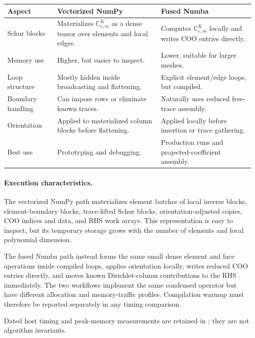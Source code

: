 \documentclass[11pt]{article}
\newcommand{\C}{\mathbb C}
\begin{document}
\begin{center}
\renewcommand{\arraystretch}{1.25}
\begin{tabular}{>{\raggedright\arraybackslash}p{} >{\raggedright\arraybackslash}p{} >{\raggedright\arraybackslash}p{}}
\toprule
Aspect & Vectorized NumPy & Fused Numba \\
\midrule
Schur blocks & Materializes $\C_{e,m}^K$ as a dense tensor over elements and local edges. & Computes $\C_{e,m}^K$ locally and writes COO entries directly. \\
Memory use & Higher, but easier to inspect. & Lower, suitable for larger meshes. \\
Loop structure & Mostly hidden inside broadcasting and flattening. & Explicit element/edge loops, but compiled. \\
Boundary handling & Can impose rows or eliminate known traces. & Naturally uses reduced free-trace assembly. \\
Orientation & Applied to materialized column blocks before flattening. & Applied locally before insertion or trace gathering. \\
Best use & Prototyping and debugging. & Production runs and projected-coefficient assembly. \\
\bottomrule
\end{tabular}
\end{center}

\paragraph{Execution characteristics.}
The vectorized NumPy path materializes element batches of local inverse blocks,
element-boundary blocks, trace-lifted Schur blocks, orientation-adjusted copies,
COO indices and data, and RHS work arrays. This representation is easy to
inspect, but its temporary storage grows with the number of elements and local
polynomial dimension.

The fused Numba path instead forms the same small dense element and face
operations inside compiled loops, applies orientation locally, writes reduced
COO entries directly, and moves known Dirichlet-column contributions to the
RHS immediately. The two workflows implement the same condensed operator but
have different allocation and memory-traffic profiles. Compilation warmup must
therefore be reported separately in any timing comparison.

Dated host timing and peak-memory measurements are retained in
; they are not
algorithm invariants.
\end{document}
